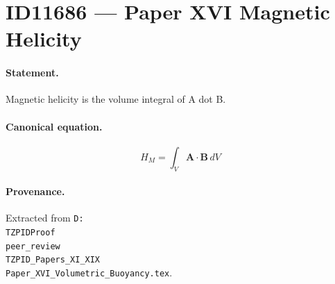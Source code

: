 \section*{ID11686 --- Paper XVI Magnetic Helicity}

\paragraph{Statement.}
Magnetic helicity is the volume integral of A dot B.

\paragraph{Canonical equation.}
\[
H_M=\int_V\mathbf{A}\cdot\mathbf{B}\,dV
\]

\paragraph{Provenance.}
Extracted from \texttt{D:\\TZPIDProof\\peer\_review\\TZPID\_Papers\_XI\_XIX\\Paper\_XVI\_Volumetric\_Buoyancy.tex}.
